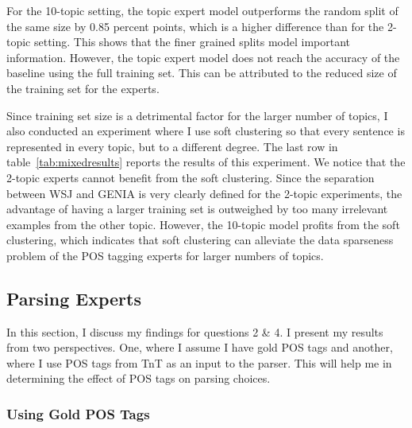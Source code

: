 For the 10-topic setting, the topic expert model outperforms the random split of the same size by 0.85 percent points, which is a higher difference than for the 2-topic setting. This shows that the finer grained  splits model important information. However, the topic expert model does not reach the accuracy of the baseline using the full training set. This can be attributed to the reduced size of the training set for the experts. 


Since training set size is a detrimental factor for the larger number of topics, I also conducted an experiment where I use soft clustering so that every sentence is represented in every topic, but to a different degree. The last row in table~\ref{tab:mixedresults} reports the results of this experiment. We notice that the 2-topic experts cannot benefit from the soft clustering. Since the separation between WSJ and GENIA is very clearly defined for the 2-topic experiments,  the advantage of having a larger training set is outweighed by too many irrelevant examples from the other topic. However, the 10-topic model profits from the soft clustering, which indicates that soft clustering can alleviate the data sparseness problem of the POS tagging experts for larger numbers of topics. 

\subsection{Parsing Experts}

In this section, I discuss my findings for questions 2 \& 4. I present my results from two perspectives. One, where I assume I have gold POS tags and another, where I use POS tags from TnT as an input to the parser. This will help me in determining the effect of POS tags on parsing choices. 

\subsubsection{Using Gold POS Tags}\label{sec:goldpos}

